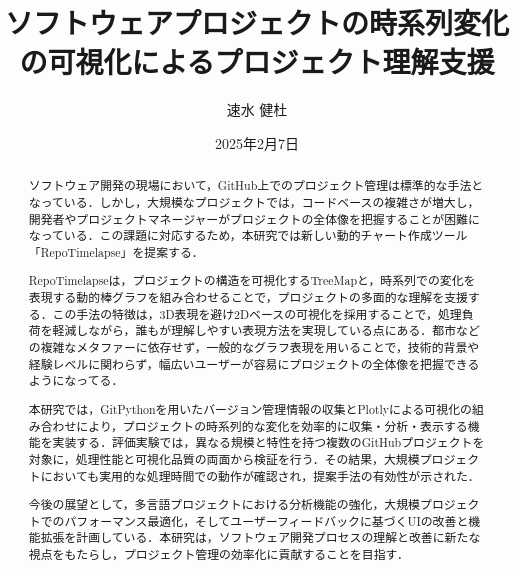 \documentclass[12pt,twoside]{jbook}
\begin{document}
\title{
  ソフトウェアプロジェクトの時系列変化の可視化によるプロジェクト理解支援
}


\author{%
  速水 健杜
}

\date{2025年2月7日}






\maketitle


\begin{abstract}
  ソフトウェア開発の現場において，GitHub上でのプロジェクト管理は標準的な手法となっている．しかし，大規模なプロジェクトでは，コードベースの複雑さが増大し，開発者やプロジェクトマネージャーがプロジェクトの全体像を把握することが困難になっている．この課題に対応するため，本研究では新しい動的チャート作成ツール「RepoTimelapse」を提案する．
  
  RepoTimelapseは，プロジェクトの構造を可視化するTreeMapと，時系列での変化を表現する動的棒グラフを組み合わせることで，プロジェクトの多面的な理解を支援する．この手法の特徴は，3D表現を避け2Dベースの可視化を採用することで，処理負荷を軽減しながら，誰もが理解しやすい表現方法を実現している点にある．都市などの複雑なメタファーに依存せず，一般的なグラフ表現を用いることで，技術的背景や経験レベルに関わらず，幅広いユーザーが容易にプロジェクトの全体像を把握できるようになってる．
  
  本研究では，GitPythonを用いたバージョン管理情報の収集とPlotlyによる可視化の組み合わせにより，プロジェクトの時系列的な変化を効率的に収集・分析・表示する機能を実装する．評価実験では，異なる規模と特性を持つ複数のGitHubプロジェクトを対象に，処理性能と可視化品質の両面から検証を行う．その結果，大規模プロジェクトにおいても実用的な処理時間での動作が確認され，提案手法の有効性が示された．

  今後の展望として，多言語プロジェクトにおける分析機能の強化，大規模プロジェクトでのパフォーマンス最適化，そしてユーザーフィードバックに基づくUIの改善と機能拡張を計画している．本研究は，ソフトウェア開発プロセスの理解と改善に新たな視点をもたらし，プロジェクト管理の効率化に貢献することを目指す．
\end{abstract}
\end{document}
